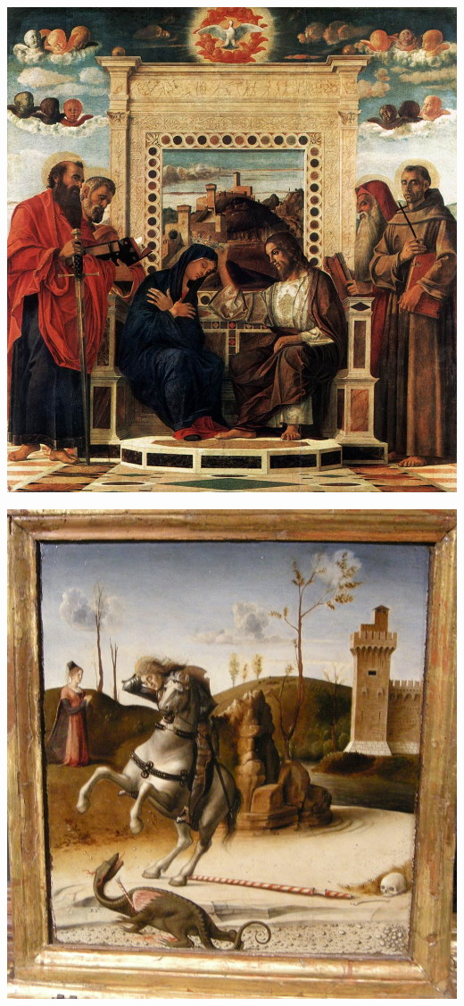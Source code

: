 \documentclass[12pt,a4paper]{article}
\begin{document}
\begin{enumerate}
	\begin{minipage}{\linewidth}
		\centering
		\begin{minipage}{0.4\linewidth}
			\includegraphics[scale=0.65]{Pala_di_pesaro_incoronazione.jpg}
		\end{minipage}
		\hfill
		\begin{minipage}{0.4\linewidth}
			\includegraphics[scale=0.1]{Pala_di_pesaro_predella.jpg}
		\end{minipage}
	\end{minipage}
	

\end{enumerate}
\end{document}

